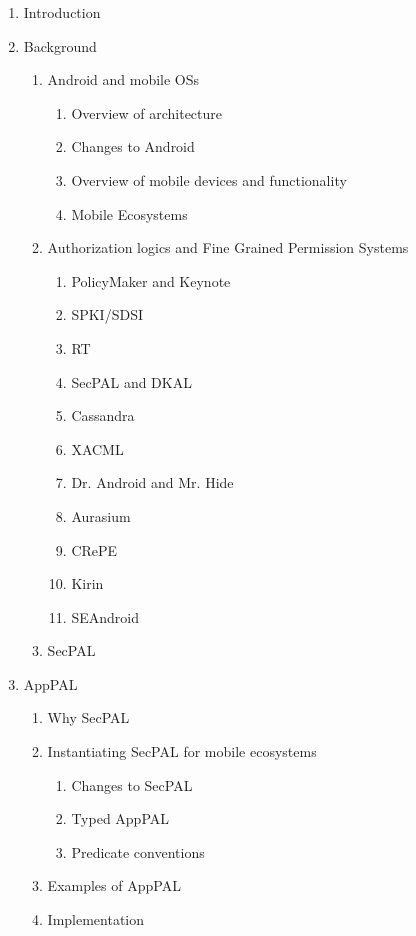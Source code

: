 \documentclass[a4paper]{scrartcl}
\begin{document}
\begin{enumerate}
\item Introduction
\item Background
  \begin{enumerate}[2.1]
  \item Android and mobile OSs
    \begin{enumerate}[2.1.1]
    \item Overview of architecture
    \item Changes to Android
    \item Overview of mobile devices and functionality
    \item Mobile Ecosystems
    \end{enumerate}
  \item Authorization logics and Fine Grained Permission Systems
    \begin{enumerate}[{2.3.}1]
    \item PolicyMaker and Keynote
    \item SPKI/SDSI
    \item RT
    \item SecPAL and DKAL
    \item Cassandra
    \item XACML
    \item Dr. Android and Mr. Hide
    \item Aurasium
    \item CRePE
    \item Kirin
    \item SEAndroid
    \end{enumerate}
  \item SecPAL
  \end{enumerate}
\item AppPAL
  \begin{enumerate}[3.1]
  \item Why SecPAL
  \item Instantiating SecPAL for mobile ecosystems
    \begin{enumerate}[{3.2.}1]
    \item Changes to SecPAL
    \item Typed AppPAL
    \item Predicate conventions
    \end{enumerate}
  \item Examples of AppPAL
  \item Implementation
  \end{enumerate}

\end{enumerate}
\end{document}

